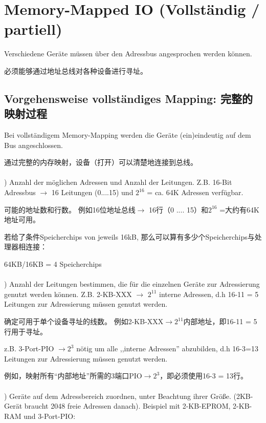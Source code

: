 \documentclass[fleqn]{article}
\begin{document}
\section{Memory-Mapped IO (Vollständig / partiell)}

\noindent Verschiedene Geräte müssen über den Adressbus angesprochen werden können.

\noindent 必须能够通过地址总线对各种设备进行寻址。


\subsection{Vorgehensweise vollständiges Mapping: 完整的映射过程} 

Bei vollständigem Memory-Mapping werden die Geräte (ein)eindeutig auf dem Bus angeschlossen.

通过完整的内存映射，设备（打开）可以清楚地连接到总线。
\\
\\
) Anzahl der möglichen Adressen und Anzahl der Leitungen. Z.B. 16-Bit Adressbus $\rightarrow$ 16 Leitungen (0....15) und $2^{16}$ = ca. 64K Adressen verfügbar.

可能的地址数和行数。 例如16位地址总线$ \rightarrow $ 16行（0 .... 15）和$ 2 ^ {16} $ =大约有64K地址可用。

若给了条件Speicherchips von jeweils 16kB, 那么可以算有多少个Speicherchips与处理器相连接：

64KB/16KB = 4 Speicherchips
\\
\\
) Anzahl der Leitungen bestimmen, die für die einzelnen Geräte zur Adressierung genutzt werden können. Z.B. 2-KB-XXX $\rightarrow$ $2^{11}$ interne Adressen, d.h 16-11 = 5 Leitungen zur Adressierung müssen genutzt werden.

确定可用于单个设备寻址的线数。 例如2-KB-XXX$\rightarrow 2 ^ {11} $内部地址，即16-11 = 5行用于寻址。

z.B. 3-Port-PIO $\rightarrow 2^3$ nötig um alle ,,interne Adressen'' abzubilden, d.h 16-3=13 Leitungen zur Adressierung müssen genutzt werden.

例如，映射所有“内部地址”所需的3端口PIO$\rightarrow 2 ^ 3 $，即必须使用16-3 = 13行。
\\
\\
) Geräte auf dem Adressbereich zuordnen, unter Beachtung ihrer Größe. (2KB-Gerät braucht 2048 freie Adressen danach). Beispiel mit 2-KB-EPROM, 2-KB-RAM und 3-Port-PIO:
\end{document}
